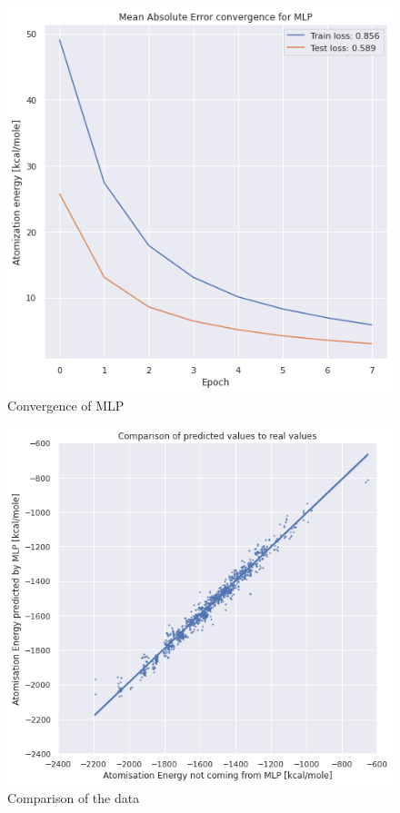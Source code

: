 \documentclass[a4paper,oneside,openright,11pt]{book}
\begin{document}
\begin{figure}[h!]
\centering
\includegraphics[scale=0.8]{DocumentFigures/Figures/MAEMLPver2.png}
\caption{Convergence of MLP}
\end{figure}


\begin{figure}[h!]
\centering
\includegraphics[scale=0.8]{DocumentFigures/Figures/COMPver2.png}
\caption{Comparison of the data}
\end{figure}
\end{document}
